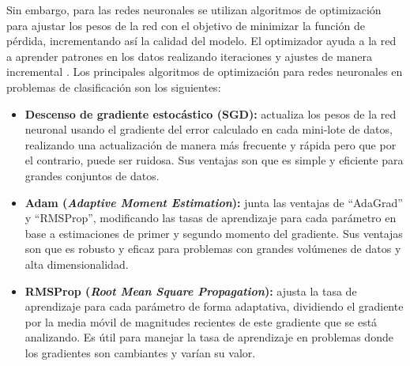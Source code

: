 Sin embargo, para las redes neuronales se utilizan algoritmos de optimización para ajustar los pesos de la red con el objetivo de minimizar la función de pérdida, incrementando así la calidad del modelo. El optimizador ayuda a la red a aprender patrones en los datos realizando iteraciones y ajustes de manera incremental \cite{optimizadores}. Los principales algoritmos de optimización para redes neuronales en problemas de clasificación son los siguientes:
\begin{itemize}
    \item \textbf{Descenso de gradiente estocástico (SGD):} actualiza los pesos de la red neuronal usando el gradiente del error calculado en cada mini-lote de datos, realizando una actualización de manera más frecuente y rápida pero que por el contrario, puede ser ruidosa. Sus ventajas son que es simple y eficiente para grandes conjuntos de datos.
    \item \textbf{Adam (\textit{Adaptive Moment Estimation}):} junta las ventajas de ``AdaGrad'' y ``RMSProp'', modificando las tasas de aprendizaje para cada parámetro en base a estimaciones de primer y segundo momento del gradiente. Sus ventajas son que es robusto y eficaz para problemas con grandes volúmenes de datos y alta dimensionalidad.
    \item \textbf{RMSProp (\textit{Root Mean Square Propagation}):} ajusta la tasa de aprendizaje para cada parámetro de forma adaptativa, dividiendo el gradiente por la media móvil de magnitudes recientes de este gradiente que se está analizando. Es útil para manejar la tasa de aprendizaje en problemas donde los gradientes son cambiantes y varían su valor.
    
\end{itemize}

